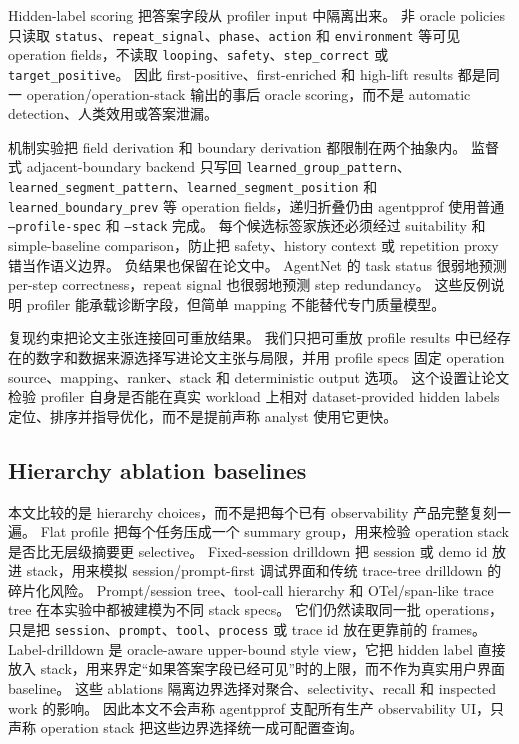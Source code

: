 \documentclass[10pt,twocolumn]{ctexart}
\newcommand{\toolname}{agentpprof}
\begin{document}
Hidden-label scoring 把答案字段从 profiler input 中隔离出来。
非 oracle policies 只读取 \texttt{status}、\texttt{repeat\_signal}、\texttt{phase}、\texttt{action} 和 \texttt{environment} 等可见 operation fields，不读取 \texttt{looping}、\texttt{safety}、\texttt{step\_correct} 或 \texttt{target\_positive}。
因此 first-positive、first-enriched 和 high-lift results 都是同一 operation/operation-stack 输出的事后 oracle scoring，而不是 automatic detection、人类效用或答案泄漏。

机制实验把 field derivation 和 boundary derivation 都限制在两个抽象内。
监督式 adjacent-boundary backend 只写回 \texttt{learned\_group\_pattern}、\texttt{learned\_segment\_pattern}、\texttt{learned\_segment\_position} 和 \texttt{learned\_boundary\_prev} 等 operation fields，递归折叠仍由 \toolname{} 使用普通 \texttt{--profile-spec} 和 \texttt{--stack} 完成。
每个候选标签家族还必须经过 suitability 和 simple-baseline comparison，防止把 safety、history context 或 repetition proxy 错当作语义边界。
负结果也保留在论文中。
AgentNet 的 task status 很弱地预测 per-step correctness，repeat signal 也很弱地预测 step redundancy。
这些反例说明 profiler 能承载诊断字段，但简单 mapping 不能替代专门质量模型。

复现约束把论文主张连接回可重放结果。
我们只把可重放 profile results 中已经存在的数字和数据来源选择写进论文主张与局限，并用 profile specs 固定 operation source、mapping、ranker、stack 和 deterministic output 选项。
这个设置让论文检验 profiler 自身是否能在真实 workload 上相对 dataset-provided hidden labels 定位、排序并指导优化，而不是提前声称 analyst 使用它更快。

\subsection{Hierarchy ablation baselines}

本文比较的是 hierarchy choices，而不是把每个已有 observability 产品完整复刻一遍。
Flat profile 把每个任务压成一个 summary group，用来检验 operation stack 是否比无层级摘要更 selective。
Fixed-session drilldown 把 session 或 demo id 放进 stack，用来模拟 session/prompt-first 调试界面和传统 trace-tree drilldown 的碎片化风险。
Prompt/session tree、tool-call hierarchy 和 OTel/span-like trace tree 在本实验中都被建模为不同 stack specs。
它们仍然读取同一批 operations，只是把 \texttt{session}、\texttt{prompt}、\texttt{tool}、\texttt{process} 或 trace id 放在更靠前的 frames。
Label-drilldown 是 oracle-aware upper-bound style view，它把 hidden label 直接放入 stack，用来界定“如果答案字段已经可见”时的上限，而不作为真实用户界面 baseline。
这些 ablations 隔离边界选择对聚合、selectivity、recall 和 inspected work 的影响。
因此本文不会声称 \toolname{} 支配所有生产 observability UI，只声称 operation stack 把这些边界选择统一成可配置查询。
\end{document}
